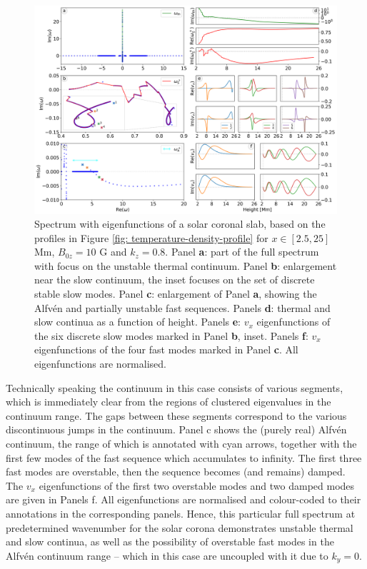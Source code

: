 \begin{figure}[t]
  \centering
  \includegraphics[width=\textwidth]{SA_corona.png}
  \caption{
    Spectrum with eigenfunctions of a solar coronal slab, based on the profiles in Figure \ref{fig: temperature-density-profile} for $x \in [2.5, 25]$ Mm, $B_{0z} = 10$ G and $k_z = 0.8$. Panel \textbf{a}: part of the full spectrum with focus on the unstable thermal continuum. Panel \textbf{b}: enlargement near the slow continuum, the inset focuses on the set of discrete stable slow modes. Panel \textbf{c}: enlargement of Panel \textbf{a}, showing the Alfv\'en and partially unstable fast sequences. Panels \textbf{d}: thermal and slow continua as a function of height. Panels \textbf{e}: $v_x$ eigenfunctions of the six discrete slow modes marked in Panel \textbf{b}, inset. Panels \textbf{f}: $v_x$ eigenfunctions of the four fast modes marked in Panel \textbf{c}. All eigenfunctions are normalised.
  }
  \label{fig: spectrum_corona}
\end{figure}

Technically speaking the continuum in this case consists of various segments, which is immediately clear from the regions of clustered eigenvalues in the continuum range. The gaps between these segments correspond to the various discontinuous jumps in the continuum. Panel c shows the (purely real) Alfv\'en continuum, the range of which is annotated with cyan arrows, together with the first few modes of the fast sequence which accumulates to infinity. The first three fast modes are overstable, then the sequence becomes (and remains) damped. The $v_x$ eigenfunctions of the first two overstable modes and two damped modes are given in Panels f. All eigenfunctions are normalised and colour-coded to their annotations in the corresponding panels. Hence, this particular full spectrum at predetermined wavenumber for the solar corona demonstrates unstable thermal and slow continua, as well as the possibility of overstable fast modes in the Alfv\'en continuum range -- which in this case are uncoupled with it due to $k_y = 0$.

